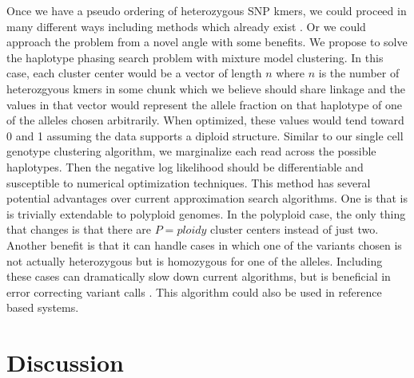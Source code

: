 Once we have a pseudo ordering of heterozygous SNP kmers, we could proceed in many different ways including methods which already exist \cite{10xlinked}. 
Or we could approach the problem from a novel angle with some benefits. We propose to solve the haplotype phasing search problem with mixture model clustering. In this case, 
each cluster center would be a vector of length $n$ where $n$ is the number of heterozgyous kmers in some chunk which we believe should share linkage and the values in that 
vector would represent the allele fraction on that haplotype of one of the alleles chosen arbitrarily. When optimized, these values would tend toward 0 and 1 assuming the data 
supports a diploid structure.  Similar to our single cell genotype clustering algorithm, we marginalize each read 
across the possible haplotypes. Then the negative log likelihood should be differentiable and susceptible to numerical optimization techniques. This method has several potential 
advantages over current approximation search algorithms. One is that is is trivially extendable to polyploid genomes. In the polyploid case, the only thing that changes is that there are $P = ploidy$ cluster centers instead of just two. Another benefit is that it can handle cases in which one of the variants chosen is not actually heterozygous but is homozygous for one 
of the alleles. Including these cases can dramatically slow down current algorithms, but is beneficial in error correcting variant calls \cite{10xpatent}. This algorithm could also be used 
in reference based systems.

\section{Discussion}

